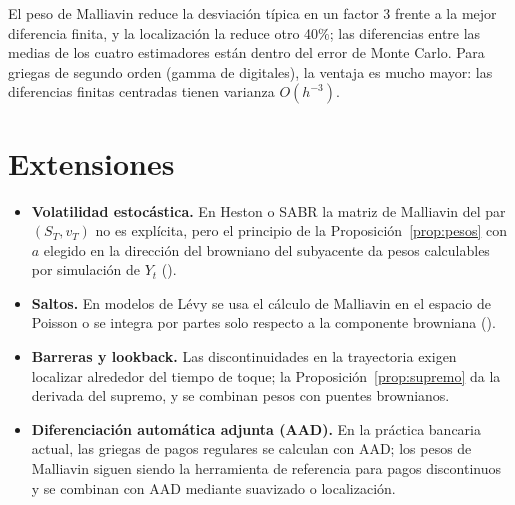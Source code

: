El peso de Malliavin reduce la desviación típica en un factor 3 frente a la mejor diferencia
finita, y la localización la reduce otro 40\%; las diferencias entre las medias de los cuatro
estimadores están dentro del error de Monte Carlo. Para griegas de segundo orden (gamma de
digitales), la ventaja es mucho mayor: las diferencias finitas centradas tienen varianza $O(h^{-3})$.

\section{Extensiones}
\begin{itemize}
  \item \textbf{Volatilidad estocástica.} En Heston o SABR la matriz de Malliavin del par $(S_T,v_T)$
  no es explícita, pero el principio de la Proposición~\ref{prop:pesos} con $a$ elegido en la dirección del
  browniano del subyacente da pesos calculables por simulación de $Y_t$ (\cite{Fournie99,MalliavinThalmaier06}).
  \item \textbf{Saltos.} En modelos de Lévy se usa el cálculo de Malliavin en el espacio de Poisson o se
  integra por partes solo respecto a la componente browniana (\cite{DiNunnoOksendalProske09}).
  \item \textbf{Barreras y lookback.} Las discontinuidades en la trayectoria exigen localizar alrededor
  del tiempo de toque; la Proposición~\ref{prop:supremo} da la derivada del supremo, y se combinan pesos
  con puentes brownianos.
  \item \textbf{Diferenciación automática adjunta (AAD).} En la práctica bancaria actual, las
  griegas de pagos regulares se calculan con AAD; los pesos de Malliavin siguen siendo
  la herramienta de referencia para pagos discontinuos y se combinan con AAD mediante
  suavizado o localización.
\end{itemize}
